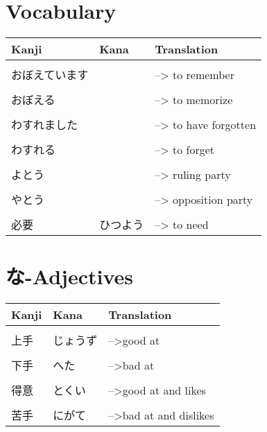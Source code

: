 \documentclass{article}
\begin{document}


\section{Vocabulary}
\begin{tabular}{ l | l l }
Kanji&Kana&Translation\\ \hline\\[-1em]
おぼえています &&--> to remember \\ \hline\\[-1em]
おぼえる &&--> to memorize \\ \hline\\[-1em]
わすれました &&--> to have forgotten \\ \hline\\[-1em]
わすれる &&--> to forget \\ \hline\\[-1em]
よとう &&--> ruling party \\ \hline\\[-1em]
やとう &&--> opposition party \\ \hline\\[-1em]
必要&ひつよう&--> to need
\end{tabular}
\section{な-Adjectives}
\begin{tabular}{ l | l l }
Kanji&Kana&Translation\\ \hline\\[-1em]
上手&じょうず&-->good at \\ \hline\\[-1em]
下手&へた&-->bad at \\ \hline\\[-1em]
得意&とくい&-->good at and likes \\ \hline\\[-1em]
苦手&にがて&-->bad at and dislikes \\ %
\end{tabular}
\end{document}
